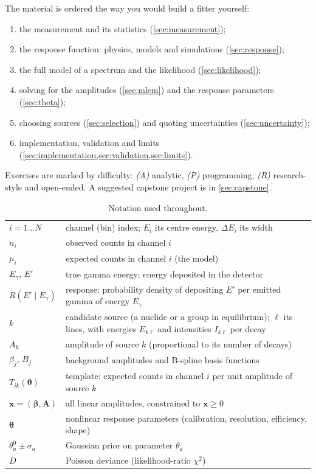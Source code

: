 \documentclass[11pt]{article}
\newcommand{\vth}{\bm{\theta}}
\newcommand{\vx}{\bm{x}}
\begin{document}
The material is ordered the way you would build a fitter yourself:
\begin{enumerate}[nosep]
\item the measurement and its statistics (\cref{sec:measurement});
\item the response function: physics, models and simulations (\cref{sec:response});
\item the full model of a spectrum and the likelihood (\cref{sec:likelihood});
\item solving for the amplitudes (\cref{sec:mlem}) and the response parameters (\cref{sec:theta});
\item choosing sources (\cref{sec:selection}) and quoting uncertainties (\cref{sec:uncertainty});
\item implementation, validation and limits (\cref{sec:implementation,sec:validation,sec:limits}).
\end{enumerate}
Exercises are marked by difficulty: \emph{(A)} analytic, \emph{(P)} programming, \emph{(R)} research-style and open-ended. A suggested capstone project is in \cref{sec:capstone}.

\begin{table}[h]
\centering\small
\caption{Notation used throughout.}\label{tab:notation}
\begin{tabularx}{\linewidth}{@{}lX@{}}
\toprule
$i = 1\dots N$ & channel (bin) index; $E_i$ its centre energy, $\Delta E_i$ its width\\
$n_i$ & observed counts in channel $i$\\
$\mu_i$ & expected counts in channel $i$ (the model)\\
$E_\gamma$, $E'$ & true gamma energy; energy deposited in the detector\\
$R(E'\mid E_\gamma)$ & response: probability density of depositing $E'$ per emitted gamma of energy $E_\gamma$\\
$k$ & candidate source (a nuclide or a group in equilibrium); $\ell$ its lines, with energies $E_{k\ell}$ and intensities $I_{k\ell}$ per decay\\
$A_k$ & amplitude of source $k$ (proportional to its number of decays)\\
$\beta_j$, $B_j$ & background amplitudes and B-spline basis functions\\
$T_{ik}(\vth)$ & template: expected counts in channel $i$ per unit amplitude of source $k$\\
$\vx = (\bm\beta,\bm A)$ & all linear amplitudes, constrained to $\vx \ge 0$\\
$\vth$ & nonlinear response parameters (calibration, resolution, efficiency, shape)\\
$\theta^0_a \pm \sigma_a$ & Gaussian prior on parameter $\theta_a$\\
$D$ & Poisson deviance (likelihood-ratio $\chi^2$)\\
\bottomrule
\end{tabularx}
\end{table}
\end{document}
